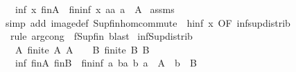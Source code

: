 \begin{isabellebody}
\ \ \ {\isachardoublequoteopen}inf\ x\ {\isacharparenleft}{\kern0pt}{\isasymSqunion}\isactrlsub f\isactrlsub i\isactrlsub nA{\isacharparenright}{\kern0pt}\ {\isacharequal}{\kern0pt}\ {\isasymSqunion}\isactrlsub f\isactrlsub i\isactrlsub n{\isacharbraceleft}{\kern0pt}inf\ x\ a{\isacharbar}{\kern0pt}a{\isachardot}{\kern0pt}\ a\ {\isasymin}\ A{\isacharbraceright}{\kern0pt}{\isachardoublequoteclose}\isanewline
%
\isadelimproof
%
\endisadelimproof
%
\isatagproof
{}\isamarkupfalse%
\ assms\ \isamarkupfalse%
\ {\isacharparenleft}{\kern0pt}simp\ add{\isacharcolon}{\kern0pt}\ image{\isacharunderscore}{\kern0pt}def\ Sup{\isacharunderscore}{\kern0pt}fin{\isachardot}{\kern0pt}hom{\isacharunderscore}{\kern0pt}commute\ {\isacharbrackleft}{\kern0pt}\ h{\isacharequal}{\kern0pt}{\isachardoublequoteopen}inf\ x{\isachardoublequoteclose}{\isacharcomma}{\kern0pt}\ OF\ inf{\isacharunderscore}{\kern0pt}sup{\isacharunderscore}{\kern0pt}distrib{}{\isacharbrackright}{\kern0pt}{\isacharparenright}{\kern0pt}\isanewline
\ \ {\isacharparenleft}{\kern0pt}rule\ arg{\isacharunderscore}{\kern0pt}cong\ {\isacharbrackleft}{\kern0pt}\ f{\isacharequal}{\kern0pt}{\isachardoublequoteopen}Sup{\isacharunderscore}{\kern0pt}fin{\isachardoublequoteclose}{\isacharbrackright}{\kern0pt}{\isacharcomma}{\kern0pt}\ blast{\isacharparenright}{\kern0pt}%
\endisatagproof
{\isafoldproof}%
%
\isadelimproof
\isanewline
%
\endisadelimproof
\isanewline
{}\isamarkupfalse%
\ inf{\isacharunderscore}{\kern0pt}Sup{}{\isacharunderscore}{\kern0pt}distrib{\isacharcolon}{\kern0pt}\isanewline
\ \ \ A{\isacharcolon}{\kern0pt}\ {\isachardoublequoteopen}finite\ A{\isachardoublequoteclose}\ {\isachardoublequoteopen}A\ {\isasymnoteq}\ {\isacharbraceleft}{\kern0pt}{\isacharbraceright}{\kern0pt}{\isachardoublequoteclose}\ \ B{\isacharcolon}{\kern0pt}\ {\isachardoublequoteopen}finite\ B{\isachardoublequoteclose}\ {\isachardoublequoteopen}B\ {\isasymnoteq}\ {\isacharbraceleft}{\kern0pt}{\isacharbraceright}{\kern0pt}{\isachardoublequoteclose}\isanewline
\ \ \ {\isachardoublequoteopen}inf\ {\isacharparenleft}{\kern0pt}{\isasymSqunion}\isactrlsub f\isactrlsub i\isactrlsub nA{\isacharparenright}{\kern0pt}\ {\isacharparenleft}{\kern0pt}{\isasymSqunion}\isactrlsub f\isactrlsub i\isactrlsub nB{\isacharparenright}{\kern0pt}\ {\isacharequal}{\kern0pt}\ {\isasymSqunion}\isactrlsub f\isactrlsub i\isactrlsub n{\isacharbraceleft}{\kern0pt}inf\ a\ b{\isacharbar}{\kern0pt}a\ b{\isachardot}{\kern0pt}\ a\ {\isasymin}\ A\ {\isasymand}\ b\ {\isasymin}\ B{\isacharbraceright}{\kern0pt}{\isachardoublequoteclose}\isanewline

\end{isabellebody}
